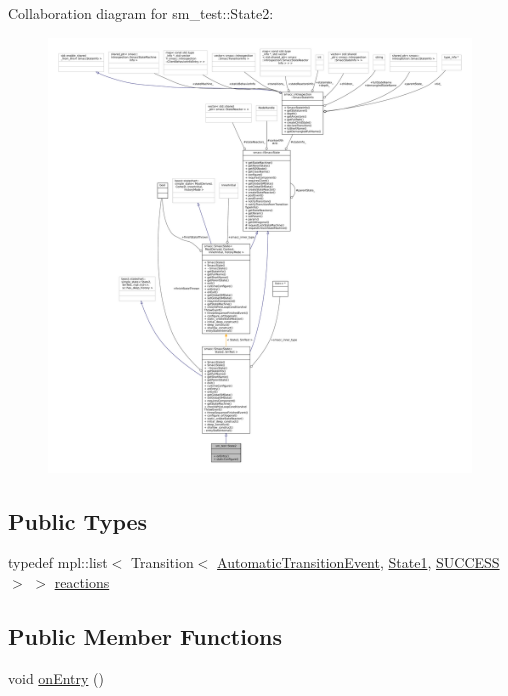 Collaboration diagram for sm\+\_\+test\+:\+:State2\+:
\nopagebreak
\begin{figure}[H]
\begin{center}
\leavevmode
\includegraphics[width=350pt]{structsm__test_1_1State2__coll__graph}
\end{center}
\end{figure}
\subsection*{Public Types}
\begin{DoxyCompactItemize}
\item 
typedef mpl\+::list$<$ Transition$<$ \hyperlink{structsm__test_1_1AutomaticTransitionEvent}{Automatic\+Transition\+Event}, \hyperlink{structsm__test_1_1State1}{State1}, \hyperlink{classSUCCESS}{S\+U\+C\+C\+E\+SS} $>$ $>$ \hyperlink{structsm__test_1_1State2_afd502acd32533d128e63707ecf8baa61}{reactions}
\end{DoxyCompactItemize}
\subsection*{Public Member Functions}
\begin{DoxyCompactItemize}
\item 
void \hyperlink{structsm__test_1_1State2_aa817bd1d4b9325967ae0a8b93bcf9f70}{on\+Entry} ()
\end{DoxyCompactItemize}
